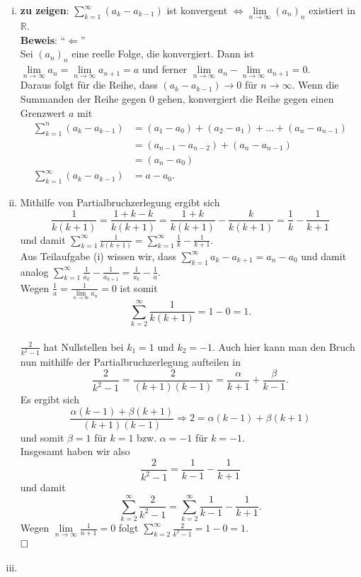 \documentclass[12pt,a4paper]{article}
\newcommand{\qed}{\null\nobreak\hfill\square}
\begin{document}
\begin{enumerate}[(i)]
    \item \textbf{zu zeigen}: $\sum\limits_{k=1}^\infty \left(a_k - a_{k-1}\right)$ ist konvergent $\Leftrightarrow \lim\limits_{n \to \infty} (a_n)_n$ existiert in $\mathbb{R}$.\\

    \textbf{Beweis}: ``$\Leftarrow$''\\
    Sei $(a_n)_n$ eine reelle Folge, die konvergiert.
    Dann ist $\lim\limits_{n \to \infty} a_n = \lim\limits_{n \to \infty} a_{n+1} = a$ und ferner $\lim\limits_{n \to \infty} a_n - \lim\limits_{n \to \infty} a_{n+1} = 0$.\\
    Daraus folgt für die Reihe, dass $(a_k - a_{k-1}) \to 0$ für $n \to \infty$.
    Wenn die Summanden der Reihe gegen 0 gehen, konvergiert die Reihe gegen einen Grenzwert $a$ mit
    \begin{align*}
        \sum\limits_{k=1}^n (a_k - a_{k-1}) &= (a_1 - a_0) + (a_2 - a_1) + \dots + (a_n - a_{n-1})\\
        &= (a_{n-1} - a_{n-2}) + (a_n - a_{n-1})\\
        &= (a_n - a_0)\\
        \sum\limits_{k=1}^\infty (a_k - a_{k-1}) &= a - a_0.
    \end{align*}

    \item Mithilfe von Partialbruchzerlegung ergibt sich
    $$\frac{1}{k(k+1)} = \frac{1+k-k}{k(k+1)} = \frac{1+k}{k(k+1)} - \frac{k}{k(k+1)} = \frac{1}{k} - \frac{1}{k+1}$$
    und damit $\sum\limits_{k=1}^\infty \frac{1}{k(k+1)} = \sum\limits_{k=1}^\infty \frac{1}{k} - \frac{1}{k+1}$.\\
    Aus Teilaufgabe (i) wissen wir, dass $\sum\limits_{k=1}^\infty a_k - a_{k+1} = a_n - a_0$ und damit analog $\sum\limits_{k=1}^\infty \frac{1}{a_k} - \frac{1}{a_{k+1}} = \frac{1}{a_k} - \frac{1}{a}$.\\
    Wegen $\frac{1}{a} = \frac{1}{\lim\limits_{n \to \infty} a_n} = 0$ ist somit
    $$\sum\limits_{k=2}^\infty \frac{1}{k(k+1)} = 1 - 0 = 1.$$\\

    $\frac{2}{k^2-1}$ hat Nullstellen bei $k_1 = 1$ und $k_2 = -1$.
    Auch hier kann man den Bruch nun mithilfe der Partialbruchzerlegung aufteilen in
    $$\frac{2}{k^2-1} = \frac{2}{(k+1)(k-1)} = \frac{\alpha}{k+1} + \frac{\beta}{k-1}.$$
    Es ergibt sich
    $$\frac{\alpha(k-1)+\beta(k+1)}{(k+1)(k-1)} \Rightarrow 2 = \alpha(k-1) + \beta(k+1)$$
    und somit $\beta = 1$ für $k = 1$ bzw. $\alpha = -1$ für $k=-1$.\\
    Insgesamt haben wir also
    $$\frac{2}{k^2-1} = \frac{1}{k-1} - \frac{1}{k+1}$$
    und damit
    $$\sum\limits_{k=2}^\infty \frac{2}{k^2-1} = \sum\limits_{k=2}^\infty \frac{1}{k-1} - \frac{1}{k+1}.$$
    Wegen $\lim\limits_{n \to \infty} \frac{1}{n+1} = 0$ folgt $\sum\limits_{k=2}^\infty \frac{2}{k^2-1} = 1 - 0 = 1.$\\
    $\qed$

    \item
\end{enumerate}
\end{document}
